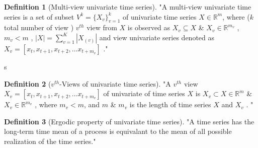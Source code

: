 \documentclass[a4paper, fleqn]{cas-sc}
\theoremstyle{definition}
\newtheorem{definition}{Definition}[section]
\theoremstyle{remark}
\begin{document}
  \begin{definition}[Multi-view univariate time series]\label{mvts}
    "A multi-view univariate time series is a set of subset $V^k= \{X_{v} \}_{v=1}^k$ of univariate time series $X\in \mathbb{R}^m$,  where ($k$ total number of view ) $v^{th}$ view from $X$ is observed as $X_v \subseteq X$ \& $X_v \in \mathbb{R}^{m_v}$ ,  $m_{v} < m$  ,  $\left|X  \right|= \sum_{v=1}^{K} \left| X_{(v)} \right|$ and view univariate series denoted as $X_v=[ x_t, x_{t+1}, x_{t+2}, ... x_{t+m_v} ]$ ."
    \end{definition} 
s
  \begin{definition}[$v^{th}$-Views of univariate time series]\label{v uts}
    "A $v^{th}$ view $X_v=[ x_t, x_{t+1}, x_{t+2}, ... x_{t+m_v} ]$ of univariate of time series $X$ is $X_v \subset X \in \mathbb{R}^{m}$ \& $X_v \in \mathbb{R}^{m_v}$ ,  where $m_{v} < m$,  and $m$ \& $m_v$ is the length of time series $X$ and $X_v$ . "
  \end{definition}

  \begin{definition}[Ergodic property of univariate time series]\label{ep uv}
    "A time series has the long-term time mean of a process is equivalant to the mean of all possible realization of the time series."    
  \end{definition}
\end{document}
